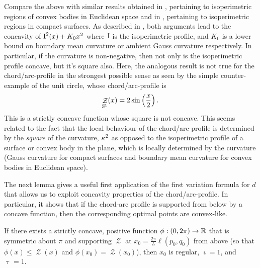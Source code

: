 \documentclass[11pt]{amsart}
\DeclareMathOperator{\chordarcprofile}{\mathcal{Z}}
\DeclareMathOperator{\tangindicator}{\iota}
\DeclareMathOperator{\norindicator}{\tau}
\begin{document}
\begin{remark}
Compare the above with similar results obtained in \cite{MR1674097}, pertaining to isoperimetric regions of convex bodies in Euclidean space and in \cite{MR875084}, pertaining to isoperimetric regions in compact surfaces. As described in \cite{pbthesis}, both arguments lead to the concavity of $\operatorname{I}^2(x) + K_0 x^2$ where $\operatorname{I}$ is the isoperimetric profile, and $K_0$ is a lower bound on boundary mean curvature or ambient Gauss curvature respectively. In particular, if the curvature is non-negative, then not only is the isoperimetric profile concave, but it's square also. Here, the analogous result is not true for the chord/arc-profile in the strongest possible sense as seen by the simple counter-example of the unit circle, whose chord/arc-profile is
\[
\chordarcprofile_{\sphere^1} (x) = 2 \sin \left(\frac{x}{2}\right).
\]
This is a strictly concave function whose square is not concave. This seems related to the fact that the local behaviour of the chord/arc-profile is determined by the \emph{square} of the curvature, $\operatorname{\kappa}^2$ as opposed to the isoperimetric profile of a surface or convex body in the plane, which is locally determined by the curvature (Gauss curvature for compact surfaces and boundary mean curvature for convex bodies in Euclidean space).
\end{remark}

The next lemma gives a useful first application of the first variation formula for \(d\) that allows us to exploit concavity properties of the chord/arc-profile. In particular, it shows that if the chord-arc profile is supported from below by a concave function, then the corresponding optimal points are convex-like.

\begin{lemma}
\label{lem:concave_barrier}
If there exists a strictly concave, positive function $\phi: (0, 2\pi) \to \mathbb{R}$ that is symmetric about $\pi$ and supporting $\chordarcprofile$ at $x_0=\tfrac{2\pi}{L} \ell(p_0,q_0)$ from above (so that $\phi(x) \leq \chordarcprofile(x)$ and $\phi(x_0)=\chordarcprofile(x_0)$), then $x_0$ is regular, $\tangindicator = 1$, and $\norindicator = 1$.
\end{lemma}
\end{document}
